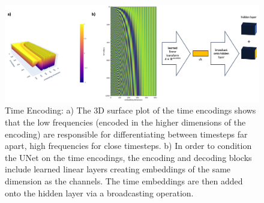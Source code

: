 \begin{figure}
    \centering
    \includegraphics[width=\textwidth]{images/t_embedding.png}
    \caption[Plots of Time Encoding]{Time Encoding: a) The 3D surface plot of the time encodings shows that the low frequencies (encoded in the higher dimensions of the encoding) are responsible for differentiating between timesteps far apart, high frequencies for close timesteps. b) In order to condition the UNet on the time encodings, the encoding and decoding blocks include learned linear layers creating embeddings of the same dimension as the channels. The time embeddings are then added onto the hidden layer via a broadcasting operation.}
    \label{fig:timeencoding}
\end{figure}